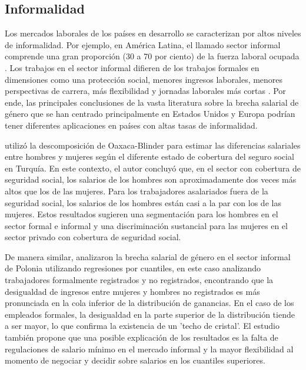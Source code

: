 \subsection{Informalidad}
Los mercados laborales de los países en desarrollo se caracterizan por altos niveles de informalidad. Por ejemplo, en América Latina, el llamado sector informal comprende una gran proporción (30 a 70 por ciento) de la fuerza laboral ocupada \citep{Maloney2004}. Los trabajos en el sector informal difieren de los trabajos formales en dimensiones como una protección social, menores ingresos laborales, menores perspectivas de carrera, más flexibilidad y jornadas laborales más cortas \citep{Berniell2021}. Por ende, las principales conclusiones de la vasta literatura sobre la brecha salarial de género que se han centrado principalmente en Estados Unidos y Europa podrían tener diferentes aplicaciones en países con altas tasas de informalidad.

\citet{Tansel2001} utilizó la descomposición de Oaxaca-Blinder para estimar las diferencias salariales entre hombres y mujeres según el diferente estado de cobertura del seguro social en Turquía. En este contexto, el autor concluyó que, en el sector con cobertura de seguridad social, los salarios de los hombres son aproximadamente dos veces más altos que los de las mujeres. Para los trabajadores asalariados fuera de la seguridad social, los salarios de los hombres están casi a la par con los de las mujeres. Estos resultados sugieren una segmentación para los hombres en el sector formal e informal y una discriminación sustancial para las mujeres en el sector privado con cobertura de seguridad social.

De manera similar, \citet{Ruzik2010} analizaron la brecha salarial de género en el sector informal de Polonia utilizando regresiones por cuantiles, en este caso analizando trabajadores formalmente registrados y no registrados, encontrando que la desigualdad de ingresos entre mujeres y hombres no registrados es más pronunciada en la cola inferior de la distribución de ganancias. En el caso de los empleados formales, la desigualdad en la parte superior de la distribución tiende a ser mayor, lo que confirma la existencia de un 'techo de cristal'. El estudio también propone que una posible explicación de los resultados es la falta de regulaciones de salario mínimo en el mercado informal y la mayor flexibilidad al momento de negociar y decidir sobre salarios en los cuantiles superiores.

